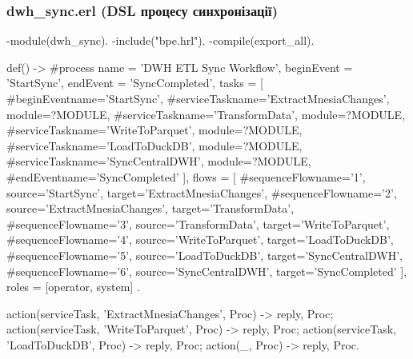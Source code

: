 \documentclass{article}
\let\originalfootnotesize\footnotesize
\let\oldverbatim\verbatim
\let\oldendverbatim\endverbatim
\renewenvironment{verbatim}{\originalfootnotesize\oldverbatim}{\oldendverbatim}
\begin{document}
\subsubsection{dwh\_sync.erl (DSL процесу синхронізації)}
\begin{verbatim}
-module(dwh_sync).
-include("bpe.hrl").
-compile(export_all).

def() ->
    #process{
        name = 'DWH ETL Sync Workflow',
        beginEvent = 'StartSync',
        endEvent = 'SyncCompleted',
        tasks = [
            #beginEvent{name='StartSync'},
            #serviceTask{name='ExtractMnesiaChanges', module=?MODULE},
            #serviceTask{name='TransformData', module=?MODULE},
            #serviceTask{name='WriteToParquet', module=?MODULE},
            #serviceTask{name='LoadToDuckDB', module=?MODULE},
            #serviceTask{name='SyncCentralDWH', module=?MODULE},
            #endEvent{name='SyncCompleted'}
        ],
        flows = [
            #sequenceFlow{name='1', source='StartSync', target='ExtractMnesiaChanges'},
            #sequenceFlow{name='2', source='ExtractMnesiaChanges', target='TransformData'},
            #sequenceFlow{name='3', source='TransformData', target='WriteToParquet'},
            #sequenceFlow{name='4', source='WriteToParquet', target='LoadToDuckDB'},
            #sequenceFlow{name='5', source='LoadToDuckDB', target='SyncCentralDWH'},
            #sequenceFlow{name='6', source='SyncCentralDWH', target='SyncCompleted'}
        ],
        roles = [operator, system]
    }.

action({serviceTask, 'ExtractMnesiaChanges'}, Proc) ->
    % Витягнення логу транзакцій з Mnesia
    {reply, Proc};
action({serviceTask, 'WriteToParquet'}, Proc) ->
    % Збереження у тимчасовий Parquet-файл на NVMe
    {reply, Proc};
action({serviceTask, 'LoadToDuckDB'}, Proc) ->
    % Виклик C99 NIF модуля для завантаження в DuckDB
    {reply, Proc};
action(_, Proc) -> {reply, Proc}.
\end{verbatim}
\end{document}
